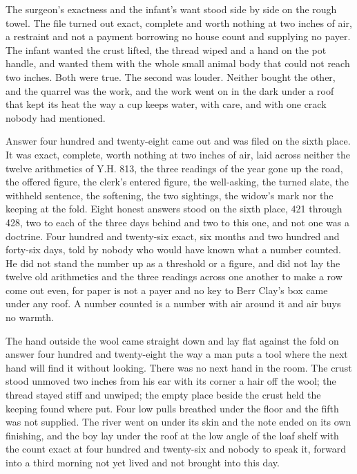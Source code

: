 The surgeon's exactness and the infant's want stood side by side on the rough towel. The file turned out exact, complete and worth nothing at two inches of air, a restraint and not a payment borrowing no house count and supplying no payer. The infant wanted the crust lifted, the thread wiped and a hand on the pot handle, and wanted them with the whole small animal body that could not reach two inches. Both were true. The second was louder. Neither bought the other, and the quarrel was the work, and the work went on in the dark under a roof that kept its heat the way a cup keeps water, with care, and with one crack nobody had mentioned.

Answer four hundred and twenty-eight came out and was filed on the sixth place. It was exact, complete, worth nothing at two inches of air, laid across neither the twelve arithmetics of Y.H. 813, the three readings of the year gone up the road, the offered figure, the clerk's entered figure, the well-asking, the turned slate, the withheld sentence, the softening, the two sightings, the widow's mark nor the keeping at the fold. Eight honest answers stood on the sixth place, 421 through 428, two to each of the three days behind and two to this one, and not one was a doctrine. Four hundred and twenty-six exact, six months and two hundred and forty-six days, told by nobody who would have known what a number counted. He did not stand the number up as a threshold or a figure, and did not lay the twelve old arithmetics and the three readings across one another to make a row come out even, for paper is not a payer and no key to Berr Clay's box came under any roof. A number counted is a number with air around it and air buys no warmth.

The hand outside the wool came straight down and lay flat against the fold on answer four hundred and twenty-eight the way a man puts a tool where the next hand will find it without looking. There was no next hand in the room. The crust stood unmoved two inches from his ear with its corner a hair off the wool; the thread stayed stiff and unwiped; the empty place beside the crust held the keeping found where put. Four low pulls breathed under the floor and the fifth was not supplied. The river went on under its skin and the note ended on its own finishing, and the boy lay under the roof at the low angle of the loaf shelf with the count exact at four hundred and twenty-six and nobody to speak it, forward into a third morning not yet lived and not brought into this day.

